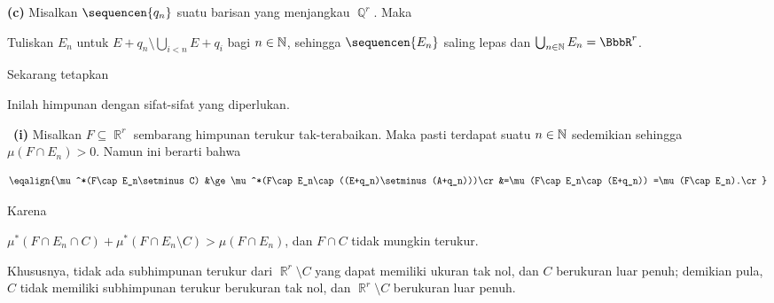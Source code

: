 {\medskip

{\bf (c)} Misalkan $\sequencen{q_n}$ suatu barisan yang menjangkau
$\BbbQ^r$. Maka


\noindent Tuliskan $E_n$ untuk
$E+q_n\setminus\bigcup_{i<n}E+q_i$ bagi $n\in\Bbb N$, sehingga
$\sequencen{E_n}$ saling lepas dan
$\bigcup_{n\in\Bbb N}E_n=\BbbR^r$.

Sekarang tetapkan


\noindent Inilah himpunan dengan sifat-sifat yang diperlukan.

\Prf\ {\bf (i)} Misalkan $F\subseteq\BbbR^r$ sembarang himpunan terukur
tak-terabaikan. Maka pasti terdapat suatu $n\in\Bbb N$ sedemikian sehingga
$\mu(F\cap E_n)>0$. Namun ini berarti bahwa


$$\eqalign{\mu^*(F\cap E_n\setminus C)
&\ge\mu^*(F\cap E_n\cap((E+q_n)\setminus(A+q_n)))\cr
&=\mu(F\cap E_n\cap(E+q_n))
=\mu(F\cap E_n).\cr}$$

\noindent Karena


\noindent
$\mu^*(F\cap E_n\cap C)+\mu^*(F\cap E_n\setminus C)>\mu(F\cap E_n)$,
dan $F\cap C$ tidak mungkin terukur.

\medskip

 Khususnya, tidak ada subhimpunan terukur dari
$\BbbR^r\setminus C$ yang dapat memiliki ukuran tak nol, dan $C$ berukuran
luar penuh; demikian pula, $C$ tidak memiliki subhimpunan terukur berukuran
tak nol, dan $\BbbR^r\setminus C$ berukuran luar penuh.\ \Qed
}%


